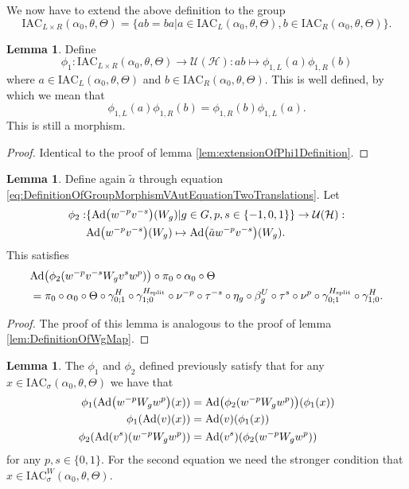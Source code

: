 \documentclass[12pt,a4paper,twoside]{article}
\newcommand{\IAC}{\textrm{IAC}}
\let\originalleft\left
\let\originalright\right
\renewcommand{\left}{\mathopen{}\mathclose\bgroup\originalleft}
\renewcommand{\right}{\aftergroup\egroup\originalright}
\newcommand{\UU}{\mathcal U}
\newcommand{\HH}{\mathcal H}
\newcommand{\Ad}[1]{\textrm{Ad}\left(#1\right)}
\theoremstyle{definition}
\newtheorem{lemma}[theorem]{Lemma}
\numberwithin{equation}{section}
\begin{document}
We now have to extend the above definition to the group
\begin{equation}
	\IAC_{L\times R}(\alpha_0,\theta,\Theta)=\{ab=ba|a\in\IAC_{L}(\alpha_0,\theta,\Theta),b\in\IAC_{R}(\alpha_0,\theta,\Theta)\}.
\end{equation}
\begin{lemma}
	Define
	\begin{equation}
		\phi_1:\IAC_{L\times R}(\alpha_0,\theta,\Theta)\rightarrow\UU(\HH):ab\mapsto \phi_{1,L}(a)\phi_{1,R}(b)
	\end{equation}
	where $a\in \IAC_{L}(\alpha_0,\theta,\Theta)$ and $b\in \IAC_{R}(\alpha_0,\theta,\Theta)$. This is well defined, by which we mean that
	\begin{equation}
		\phi_{1,L}(a)\phi_{1,R}(b)=\phi_{1,R}(b)\phi_{1,L}(a).
	\end{equation}
	This is still a morphism.
\end{lemma}
\begin{proof}
	Identical to the proof of lemma \ref{lem:extensionOfPhi1Definition}.
\end{proof}
\begin{lemma}\label{lem:DefinitionOfWgMapTwoTranslations}
	Define again $\tilde{a}$ through equation \eqref{eq:DefinitionOfGroupMorphismVAutEquationTwoTranslations}. Let
	\begin{align}
		\phi_2:&\{\Ad{w^{-p}v^{-s}}(W_g)|g\in G,p,s\in\{-1,0,1\}\}\rightarrow \UU(\HH):\\
		\nonumber
		&\Ad{w^{-p}v^{-s}}(W_g) \mapsto \Ad{\tilde{a} w^{-p}v^{-s}}(W_g).
	\end{align}
	This satisfies
	\begin{align}\label{eq:lemDefinitionOfWgMapConditionTwoTranslations}
		&\Ad{\phi_2(w^{-p}v^{-s}W_g v^{s} w^p)}\circ\pi_0\circ\alpha_0\circ\Theta\\
		\nonumber
		&=\pi_0\circ \alpha_0\circ\Theta\circ\gamma^{H}_{0;1}\circ\gamma^{H_{\text{split}}}_{1;0}\circ\nu^{-p}\circ\tau^{-s}\circ\eta_g\circ\beta_g^U\circ\tau^s\circ\nu^p\circ\gamma^{H_{\text{split}}}_{0;1}\circ\gamma^{H}_{1;0}.
	\end{align}
\end{lemma}
\begin{proof}
	The proof of this lemma is analogous to the proof of lemma \ref{lem:DefinitionOfWgMap}.
\end{proof}
\begin{lemma}\label{lem:phi1phi2matchingConditionH1ValuedIndex}
The $\phi_1$ and $\phi_2$ defined previously satisfy that for any $x\in\IAC_{\sigma}(\alpha_0,\theta,\Theta)$ we have that
	\begin{align}
		\phi_1(\Ad{w^{-p} W_g w^{p}}(x))&=\Ad{\phi_2(w^{-p} W_g w^{p})}(\phi_1(x))\\
		\phi_1(\Ad{v}(x))&=\Ad{v}(\phi_1(x))\\
		\phi_2(\Ad{v^s}(w^{-p} W_gw^{p}))&=\Ad{v^s}(\phi_2(w^{-p} W_g w^{p}))
	\end{align}
	for any $p,s\in\{0,1\}$. For the second equation we need the stronger condition that $x\in\IAC_{\sigma}^W(\alpha_0,\theta,\Theta)$.
\end{lemma}
\end{document}

